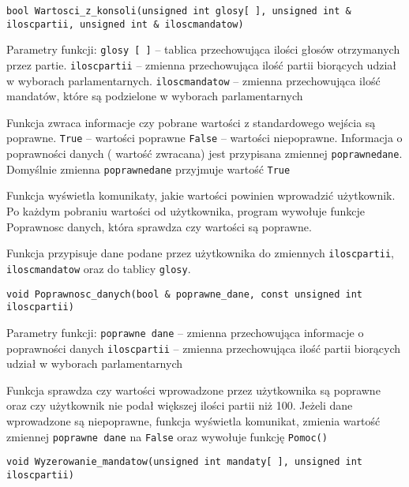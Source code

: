 \documentclass[12pt,a4paper]{article}
\begin{document}
\begin{lstlisting}
bool Wartosci_z_konsoli(unsigned int glosy[ ], unsigned int & iloscpartii, unsigned int & iloscmandatow)
\end{lstlisting} 
Parametry funkcji:
\newline \texttt{glosy [ ]} -- tablica przechowująca ilości głosów otrzymanych przez partie. \texttt{iloscpartii} -- zmienna przechowująca ilość partii biorących udział w wyborach parlamentarnych. 
\texttt{iloscmandatow} -- zmienna przechowująca ilość mandatów, które są podzielone w wyborach parlamentarnych \newline

Funkcja zwraca informacje czy pobrane wartości z standardowego wejścia są poprawne. \texttt{True} -- wartości poprawne \texttt{False} -- wartości niepoprawne. Informacja o poprawności danych ( wartość zwracana) jest przypisana zmiennej \texttt{poprawnedane}. Domyślnie zmienna \texttt{poprawnedane} przyjmuje wartość \texttt{True} \newline

Funkcja wyświetla komunikaty, jakie wartości powinien wprowadzić użytkownik.
Po każdym pobraniu wartości od użytkownika, program wywołuje funkcje Poprawnosc danych, która sprawdza czy wartości są poprawne. 

Funkcja przypisuje dane podane przez użytkownika do zmiennych \texttt{iloscpartii}, \texttt{iloscmandatow} oraz do tablicy \texttt{glosy}.    
\begin{lstlisting}
void Poprawnosc_danych(bool & poprawne_dane, const unsigned int iloscpartii)
\end{lstlisting} 

Parametry funkcji:
\newline \texttt{poprawne dane} -- zmienna przechowująca informacje o poprawności danych
\newline \texttt{iloscpartii} -- zmienna przechowująca ilość partii biorących udział w wyborach parlamentarnych 

Funkcja sprawdza czy wartości wprowadzone przez użytkownika są poprawne oraz czy użytkownik nie podał większej ilości partii niż 100. Jeżeli dane wprowadzone są niepoprawne, funkcja wyświetla komunikat, zmienia wartość zmiennej \texttt{poprawne dane} na \texttt{False} oraz wywołuje funkcję \texttt{Pomoc()}

\begin{lstlisting}
void Wyzerowanie_mandatow(unsigned int mandaty[ ], unsigned int iloscpartii)
\end{lstlisting}
\end{document}
